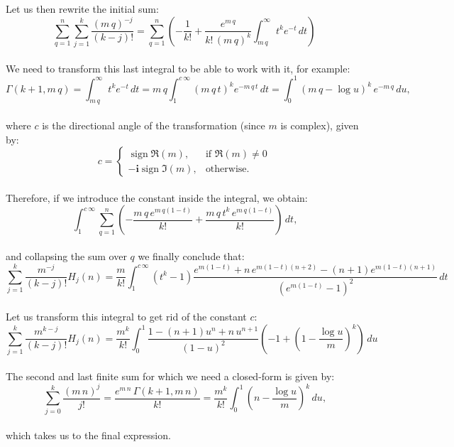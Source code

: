 \documentclass[12pt]{article}
\DeclareMathOperator{\sign}{sign}
\newcommand{\ii}{\bm{i}}
\begin{document}
Let us then rewrite the initial sum:
\begin{equation} \nonumber
\sum_{q=1}^{n}\sum_{j=1}^{k}\frac{(m\,q)^{-j}}{(k-j)!}=\sum_{q=1}^{n}\left(-\frac{1}{k!}+\frac{e^{m\,q}}{k!\,(m\,q)^{k}}\int_{m\,q}^{\infty}t^k e^{-t}\,dt\right) \text{}
\end{equation}\\
\indent We need to transform this last integral to be able to work with it, for example: 
\begin{equation} \nonumber
\Gamma{(k+1,m\,q)}=\int_{m\,q}^{\infty}t^k e^{-t}\,dt=m\,q\int_{1}^{c\,\infty}(m\,q\,t)^k e^{-m\,q\,t}\,dt=\int_{0}^{1}(m\,q-\log{u})^k\,e^{-m\,q}\,du \text{,}
\end{equation}\\
\noindent where $c$ is the directional angle of the transformation (since $m$ is complex), given by:
\begin{equation} \nonumber
c=\begin{cases}
\sign{\Re{(m)}}, & \text{if }\Re{(m)} \neq 0\\
-\ii\sign{\Im{(m)}}, & \text{otherwise.}
\end{cases}
\end{equation}\\
\indent Therefore, if we introduce the constant inside the integral, we obtain:
\begin{equation} \nonumber
\int_{1}^{c\,\infty}\sum_{q=1}^{n}\left(-\frac{m\,q\,e^{m\,q(1-t)}}{k!}+\frac{m\,q\,t^k\,e^{m\,q(1-t)}}{k!}\right)\,dt \text{,}
\end{equation}\\
\noindent and collapsing the sum over $q$ we finally conclude that:
\begin{equation} \nonumber
\sum_{j=1}^{k}\frac{m^{-j}}{(k-j)!}H_j(n)=\frac{m}{k!}\int_{1}^{c\,\infty}(t^k-1)\frac{e^{m(1-t)}+n\,e^{m(1-t)(n+2)}-(n+1)e^{m(1-t)(n+1)}}{(e^{m(1-t)}-1)^2}\,dt
\end{equation}\\
\indent Let us transform this integral to get rid of the constant $c$:
\begin{equation} \nonumber
\sum_{j=1}^{k}\frac{m^{k-j}}{(k-j)!}H_j(n)=\frac{m^k}{k!}\int_{0}^{1}\frac{1-(n+1)u^n+n\,u^{n+1}}{(1-u)^2}\left(-1+\left(1-\frac{\log{u}}{m}\right)^k\right)\,du
\end{equation}\\
\indent The second and last finite sum for which we need a closed-form is given by: 
\begin{equation} \nonumber
\sum_{j=0}^{k}\frac{(m\,n)^j}{j!}=\frac{e^{m\,n}\,\Gamma{(k+1,m\,n)}}{k!}=\frac{m^k}{k!}\int_{0}^{1}\left(n-\frac{\log{u}}{m}\right)^k\,du \text{,}
\end{equation}\\
\noindent which takes us to the final expression.\\
\end{document}
